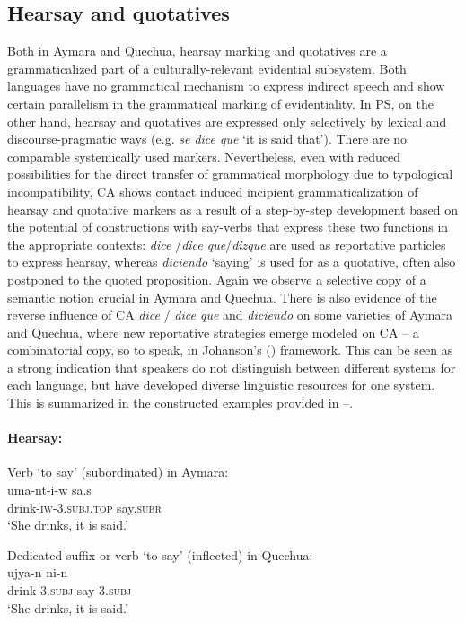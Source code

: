 \documentclass[output=paper,hidelinks]{langscibook}
\begin{document}
\subsection{Hearsay and quotatives}
\label{analysis2:hearsay}
Both in Aymara and Quechua, hearsay marking and quotatives are a grammaticalized part of a culturally-relevant evidential subsystem. Both languages have no grammatical mechanism to express indirect speech and show certain parallelism in the grammatical marking of evidentiality. In PS, on the other hand, hearsay and quotatives are expressed only selectively by lexical and discourse-pragmatic ways (e.g. \textit{se dice que} ‘it is said that’). There are no comparable systemically used markers. Nevertheless, even with reduced possibilities for the direct transfer of grammatical morphology due to typological incompatibility, CA shows contact induced incipient grammaticalization of hearsay and quotative markers as a result of a step-by-step development based on the potential of constructions with say-verbs that express these two functions in the appropriate contexts: \textit{dice} /\textit{dice que}/\textit{dizque} are used as reportative particles to express hearsay, whereas \textit{diciendo} `saying' is used for as a quotative, often also postponed to the quoted proposition. Again we observe a selective copy of a semantic notion crucial in Aymara and Quechua. There is also evidence of the reverse influence of CA \textit{dice} / \textit{dice que} and \textit{diciendo} on some varieties of Aymara and Quechua, where new reportative strategies emerge modeled on CA -- a combinatorial copy, so to speak, in Johanson's (\citeyear{RN59}) framework. This can be seen as a strong indication that speakers do not distinguish between different systems for each language, but have developed diverse linguistic resources for one system. This is summarized in the constructed examples provided in --.


\paragraph*{Hearsay:}

\ea \label{ex:hearsay.Ay}
 {Verb `to say' (subordinated) in Aymara:} \\
\gll uma-nt-i-w sa.s \\
drink-\textsc{iw-3.subj.top} say.\textsc{subr}\\
\glt ‘She drinks, it is said.’ 
\z

\ea \label{ex:hearsay.Qu}
 {Dedicated suffix or verb `to say' (inflected) in Quechua:} \\
\gll ujya-n ni-n \\
drink-3.\textsc{subj} say-3.\textsc{subj}\\
\glt ‘She drinks, it is said.’ 
\z
\end{document}
